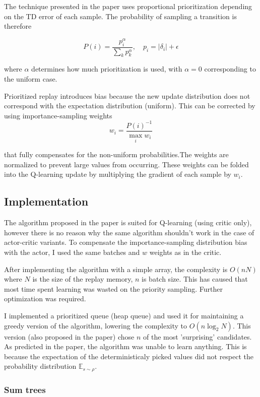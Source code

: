 The technique presented in the paper uses proportional prioritization depending on the TD error of each sample. The probability of sampling a transition is therefore

\begin{equation}
P(i) = \dfrac{p_i^\alpha}{\sum_k p_k^\alpha}, \quad p_i = |\delta_i|+\epsilon
\end{equation}

where $\alpha$ determines how much prioritization is used, with $\alpha=0$ corresponding to the uniform case.

Prioritized replay introduces bias because the new update distribution does not correspond with the expectation distribution (uniform). This can be corrected by using importance-sampling weights
\begin{equation}
w_i=\dfrac{P(i)^{-1}}{\max_i w_i}
\end{equation}

that fully compensates for the non-uniform probabilities.The weights are normalized to prevent large values from occurring. These weights can be folded into the Q-learning update by multiplying the gradient of each sample by $w_i$.

\subsection{Implementation}
The algorithm proposed in the paper is suited for Q-learning (using critic only), however there is no reason why the same algorithm shouldn't work in the case of actor-critic variants.
To compensate the importance-sampling distribution bias with the actor, I used the same batches and $w$ weights as in the critic.

After implementing the algorithm with a simple array, the complexity is $O(nN)$ where $N$ is the size of the replay memory, $n$ is batch size. This has caused that most time spent learning was wasted on the priority sampling. Further optimization was required. 

I implemented a prioritized queue (heap queue) and used it for maintaining a greedy version of the algorithm, lowering the complexity to $O(n\log_2N)$. This version (also proposed in the paper) chose $n$ of the most 'surprising' candidates. As predicted in the paper, the algorithm was unable to learn anything. This is because the expectation of the deterministicaly picked values did not respect the probability distribution $\mathbb{E}_{s \sim \rho}$.

\subsubsection{Sum trees}

